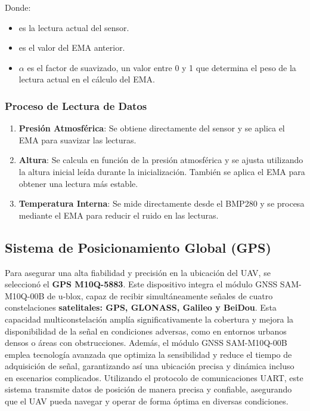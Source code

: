                Donde:\vspace{5px}

                \begin{itemize}
                    \item {} es la lectura actual del sensor.
                    \item {} es el valor del EMA anterior.
                    \item $\alpha$ es el factor de suavizado, un valor entre 0 y 1 que determina el peso de la lectura actual en el cálculo del EMA.
                \end{itemize}

            \subsubsection{Proceso de Lectura de Datos}\vspace{5px}

            \begin{enumerate}
                \item \textbf{Presión Atmosférica}: Se obtiene directamente del sensor y se aplica el EMA para suavizar las lecturas.
                \item \textbf{Altura}: Se calcula en función de la presión atmosférica y se ajusta utilizando la altura inicial leída durante la inicialización. También se aplica el EMA para obtener una lectura más estable.
                \item \textbf{Temperatura Interna}: Se mide directamente desde el BMP280 y se procesa mediante el EMA para reducir el ruido en las lecturas.
            \end{enumerate}\vspace{5px}



    \subsection{Sistema de Posicionamiento Global (GPS)}\vspace{5px}

        Para asegurar una alta fiabilidad y precisión en la ubicación del UAV, se seleccionó el \textbf{GPS M10Q-5883}. Este dispositivo integra el módulo GNSS SAM-M10Q-00B de u-blox, capaz de recibir simultáneamente señales de cuatro constelaciones \textbf{satelitales: GPS, GLONASS, Galileo y BeiDou}.\cite{GPS} Esta capacidad multiconstelación amplía significativamente la cobertura y mejora la disponibilidad de la señal en condiciones adversas, como en entornos urbanos densos o áreas con obstrucciones. Además, el módulo GNSS SAM-M10Q-00B emplea tecnología avanzada que optimiza la sensibilidad y reduce el tiempo de adquisición de señal, garantizando así una ubicación precisa y dinámica incluso en escenarios complicados. Utilizando el protocolo de comunicaciones UART, este sistema transmite datos de posición de manera precisa y confiable, asegurando que el UAV pueda navegar y operar de forma óptima en diversas condiciones. \vspace{5px}


